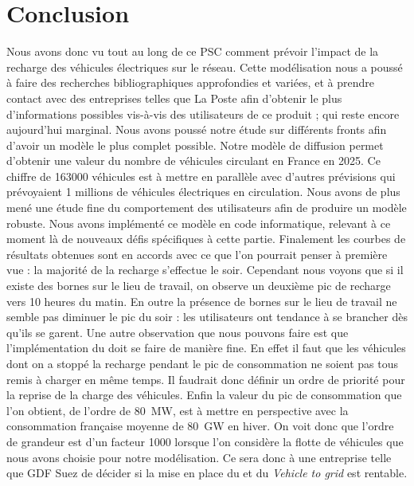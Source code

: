 \section*{Conclusion}

Nous avons donc vu tout au long de ce PSC comment prévoir l'impact de la recharge des véhicules électriques sur le réseau. Cette modélisation nous a poussé à faire des recherches bibliographiques approfondies et variées, et à prendre contact avec des entreprises telles que La Poste afin d'obtenir le plus d'informations possibles vis-à-vis des utilisateurs de ce produit ; qui reste encore aujourd'hui marginal. Nous avons poussé notre étude sur différents fronts afin d'avoir un modèle le plus complet possible. Notre modèle de diffusion permet d'obtenir une valeur du nombre de véhicules circulant en France en 2025. Ce chiffre de \num{163000} véhicules est à mettre en parallèle avec d'autres prévisions qui prévoyaient 1 millions de véhicules électriques en circulation. Nous avons de plus mené une étude fine du comportement des utilisateurs afin de produire un modèle robuste. Nous avons implémenté ce modèle en code informatique, relevant à ce moment là de nouveaux défis spécifiques à cette partie. Finalement les courbes de résultats obtenues sont en accords avec ce que l'on pourrait penser à première vue : la majorité de la recharge s'effectue le soir. Cependant nous voyons que si il existe des bornes sur le lieu de travail, on observe un deuxième pic de recharge vers 10 heures du matin. En outre la présence de bornes sur le lieu de travail ne semble pas diminuer le pic du soir : les utilisateurs ont tendance à se brancher dès qu'ils se garent. Une autre observation que nous pouvons faire est que l'implémentation du \smartgrid{} doit se faire de manière fine. En effet il faut que les véhicules dont on a stoppé la recharge pendant le pic de consommation ne soient pas tous remis à charger en même temps. Il faudrait donc définir un ordre de priorité pour la reprise de la charge des véhicules. Enfin la valeur du pic de consommation que l'on obtient, de l'ordre de \SI{80}{\mega\watt}, est à mettre en perspective avec la consommation française moyenne de \SI{80}{\giga\watt} en hiver. On voit donc que l'ordre de grandeur est d'un facteur \num{1000} lorsque l'on considère la flotte de véhicules que nous avons choisie pour notre modélisation. Ce sera donc à une entreprise telle que GDF Suez de décider si la mise en place du \smartgrid{} et du \emph{Vehicle to grid} est rentable.


